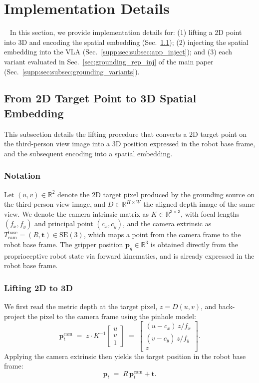 \section{Implementation Details}~\label{supp:sec:implementation_details}
In this section, we provide implementation details for: (1) lifting a 2D point into 3D and encoding the spatial embedding (Sec.~\ref{supp:sec:subsec:lifting}); (2) injecting the spatial embedding into the VLA (Sec.~\ref{supp:sec:subsec:app_inject}); and (3) each variant evaluated in Sec.~\ref{sec:grounding_rep_inj} of the main paper (Sec.~\ref{supp:sec:subsec:grounding_variants}).

\subsection{From 2D Target Point to 3D Spatial Embedding}
\label{supp:sec:subsec:lifting}
This subsection details the lifting procedure that converts a 2D target point on the third-person view image into a 3D position expressed in the robot base frame, and the subsequent encoding into a spatial embedding.

\subsubsection{Notation}
Let $(u, v) \in \mathbb{R}^2$ denote the 2D target pixel produced by the grounding source on the third-person view image, and $D \in \mathbb{R}^{H \times W}$ the aligned depth image of the same view. We denote the camera intrinsic matrix as $K \in \mathbb{R}^{3 \times 3}$, with focal lengths $(f_x, f_y)$ and principal point $(c_x, c_y)$, and the camera extrinsic as $T^{\text{base}}_{\text{cam}} = (R, \mathbf{t}) \in \mathrm{SE}(3)$, which maps a point from the camera frame to the robot base frame. The gripper position $\mathbf{p}_g \in \mathbb{R}^3$ is obtained directly from the proprioceptive robot state via forward kinematics, and is already expressed in the robot base frame.

\subsubsection{Lifting 2D to 3D}
We first read the metric depth at the target pixel, $z = D(u, v)$, and back-project the pixel to the camera frame using the pinhole model:
\begin{equation}
    \mathbf{p}^{\text{cam}}_t \;=\; z \cdot K^{-1} \begin{bmatrix} u \\ v \\ 1 \end{bmatrix}
    \;=\;
    \begin{bmatrix}
        (u - c_x)\, z / f_x \\
        (v - c_y)\, z / f_y \\
        z
    \end{bmatrix}.
\end{equation}
Applying the camera extrinsic then yields the target position in the robot base frame:
\begin{equation}
\mathbf{p}_t \;=\; R\, \mathbf{p}^{\text{cam}}_t + \mathbf{t}.
\end{equation}
